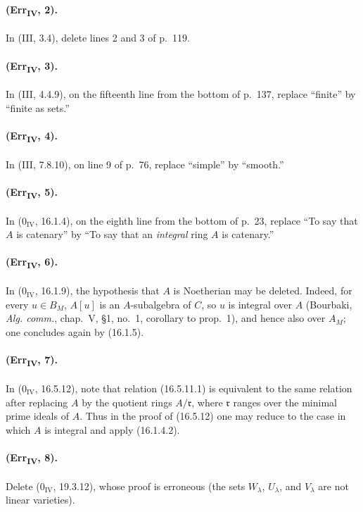 \paragraph{(Err\textsubscript{IV}, 2).}
In (III, 3.4), delete lines 2 and 3 of p.~119.

\paragraph{(Err\textsubscript{IV}, 3).}
In (III, 4.4.9), on the fifteenth line from the bottom of p.~137,
replace ``finite'' by ``finite as sets.''

\paragraph{(Err\textsubscript{IV}, 4).}
In (III, 7.8.10), on line 9 of p.~76, replace ``simple'' by ``smooth.''

\paragraph{(Err\textsubscript{IV}, 5).}
In ($0_{\mathrm{IV}}$, 16.1.4), on the eighth line from the bottom of
p.~23, replace ``To say that $A$ is catenary'' by ``To say that an
\emph{integral} ring $A$ is catenary.''

\paragraph{(Err\textsubscript{IV}, 6).}
In ($0_{\mathrm{IV}}$, 16.1.9), the hypothesis that $A$ is Noetherian
may be deleted.  Indeed, for every $u\in B_M$, $A[u]$ is an
$A$-subalgebra of $C$, so $u$ is integral over $A$ (Bourbaki,
\emph{Alg. comm.}, chap.~V, \S1, no.~1, corollary to prop.~1), and
hence also over $A_M$; one concludes again by (16.1.5).

\paragraph{(Err\textsubscript{IV}, 7).}
In ($0_{\mathrm{IV}}$, 16.5.12), note that relation (16.5.11.1) is
equivalent to the same relation after replacing $A$ by the quotient rings
$A/\mathfrak r$, where $\mathfrak r$ ranges over the minimal prime ideals
of $A$.  Thus in the proof of (16.5.12) one may reduce to the case in
which $A$ is integral and apply (16.1.4.2).

\paragraph{(Err\textsubscript{IV}, 8).}
Delete ($0_{\mathrm{IV}}$, 19.3.12), whose proof is erroneous (the sets
$W_\lambda$, $U_\lambda$, and $V_\lambda$ are not linear varieties).

